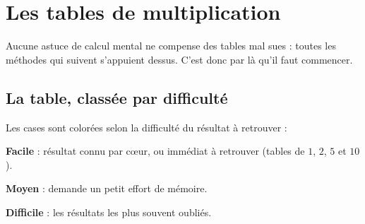 \section[Les tables de multiplication]{Les tables de multiplication }

Aucune astuce de calcul mental ne compense des tables mal sues : toutes les méthodes
qui suivent s'appuient dessus. C'est donc par là qu'il faut commencer.

\subsection{La table, classée par difficulté}

\begin{aretenir}[title={Comment lire cette table}]
Les cases sont colorées selon la difficulté du résultat à retrouver :

\begin{compactitem}
\item {} \textbf{Facile} : résultat connu par
      cœur, ou immédiat à retrouver (tables de $1$, $2$, $5$ et $10$).
\item {} \textbf{Moyen} : demande un petit effort de
      mémoire.
\item {} \textbf{Difficile} : les résultats les
      plus souvent oubliés.
\end{compactitem}
\end{aretenir}

